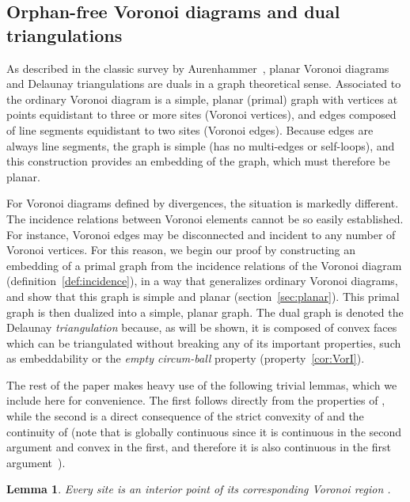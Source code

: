 \documentclass[11pt]{article}
\newtheorem{lemma}{Lemma}
\begin{document}
	

\subsection{Orphan-free Voronoi diagrams and dual triangulations}\label{sec:simpleplanar}



As described in the classic survey by Aurenhammer~\cite{Aurenhammer:1991}, 
	planar Voronoi diagrams and Delaunay triangulations are duals in a graph theoretical sense. 
Associated to the ordinary Voronoi diagram is a simple, planar (primal) graph with vertices at 
	points equidistant to three or more sites (Voronoi vertices), 
	and edges composed of line segments 
	equidistant to two sites (Voronoi edges). 
Because edges are always line segments, the graph is simple (has no multi-edges or self-loops), 
	and this construction provides an embedding of the graph, which must therefore be planar. 

	
	
For Voronoi diagrams defined by divergences, the situation is markedly different. 
The incidence relations between Voronoi elements cannot be so easily established. 
For instance, Voronoi edges may be disconnected and incident to any number of Voronoi vertices. 
For this reason, we begin our proof by constructing an embedding of a primal graph 
	from the incidence relations of the Voronoi diagram (definition~\ref{def:incidence}), 
	in a way that generalizes ordinary Voronoi diagrams, 
	and show that this graph is simple and planar (section~\ref{sec:planar}).
This primal graph is then dualized into a simple, planar graph. 
The dual graph is denoted the Delaunay \emph{triangulation} because, as will be shown, 
	it is composed of convex faces which can be triangulated without breaking any of 
	its important properties, such as embeddability or the \emph{empty circum-ball} property (property~\ref{cor:VorI}). 	


The rest of the paper makes heavy use of the following trivial lemmas, which we include here for convenience. 
The first follows directly from the properties of , while the second
	is a direct consequence of the strict convexity of  and the continuity of 
	(note that  is globally continuous since it is continuous in the second argument 
	and convex in the first, and therefore it is also continuous in the first argument~\cite{rockafellar1997convex}). 



\begin{lemma}\label{lem:site}
Every site  is an interior point of its corresponding Voronoi region . 
\end{lemma}
\end{document}
